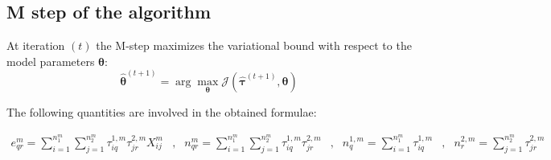 \documentclass[12pt,a4paper]{report}
\begin{document}


\subsection{M step of the algorithm}
\label{ssec:m-step-of-the-algorithm}
At iteration $(t)$ the M-step maximizes the variational bound with respect to
the model parameters $\bm{\theta}$:
\[
    \widehat{\bm{\theta}}^{(t+1)} = \arg \max_{\bm{\theta}} \mathcal{J}(\mathcal{\bm{\widehat{\tau}}}^{(t+1)},\bm{\theta})
\]

The following quantities are involved in the obtained formulae:

\begin{align*}
    e^{m}_{qr} = \sum_{i=1}^{n_1^m} \sum_{j=1}^{n_2^m} \tau_{iq}^{1,m} \tau_{jr}^{2,m} X_{ij}^m
    &,& n^{m}_{qr} = \sum_{i=1}^{n_1^m} \sum_{j=1}^{n_2^m} \tau_{iq}^{1,m} \tau_{jr}^{2,m}
    &,& n^{1,m}_{q} = \sum_{i=1}^{n_1^m} \tau_{iq}^{1,m}
    &,& n^{2,m}_{r} = \sum_{j=1}^{n_2^m} \tau_{jr}^{2,m}
\end{align*}
\end{document}
